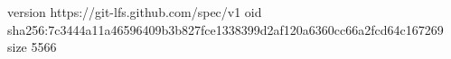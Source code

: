 version https://git-lfs.github.com/spec/v1
oid sha256:7c3444a11a46596409b3b827fce1338399d2af120a6360cc66a2fcd64c167269
size 5566
